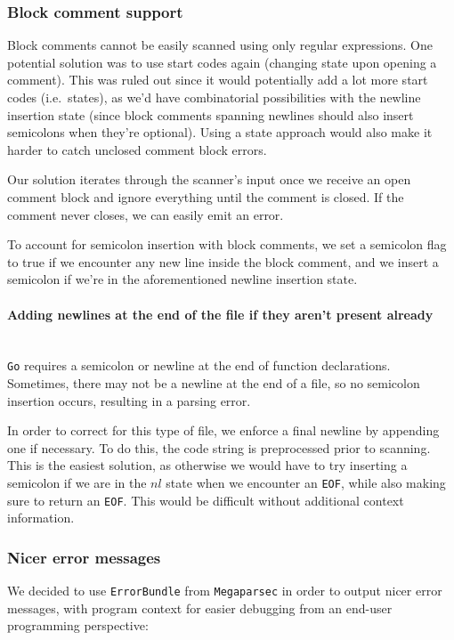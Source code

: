 \documentclass[11pt]{article}
\begin{document}
\subsubsection{Block comment support}
Block comments cannot be easily scanned using only regular
expressions. One potential solution was to use start codes again
(changing state upon opening a comment). This was ruled out since it
would potentially add a lot more start codes (i.e.\ states), as we'd
have combinatorial possibilities with the newline insertion state
(since block comments spanning newlines should also insert semicolons
when they're optional). Using a state approach would also make it
harder to catch unclosed comment block errors.

Our solution iterates through the scanner's input once we receive an
open comment block and ignore everything until the comment is closed.
If the comment never closes, we can easily emit an error.

To account for semicolon insertion with block comments, we set a
semicolon flag to true if we encounter any new line inside the block
comment, and we insert a semicolon if we're in the aforementioned
newline insertion state.
\paragraph{Adding newlines at the end of the file if they aren't
  present already}~\\
\texttt{Go} requires a semicolon or newline at the end of function
declarations. Sometimes, there may not be a newline at the end of a
file, so no semicolon insertion occurs, resulting in a parsing error.

In order to correct for this type of file, we enforce a final newline
by appending one if necessary. To do this, the code string is
preprocessed prior to scanning. This is the easiest solution, as
otherwise we would have to try inserting a semicolon if we are in the
\(nl\) state when we encounter an \texttt{EOF}, while also making sure
to return an \texttt{EOF}. This would be difficult without additional
context information.
\subsubsection{Nicer error messages}
We decided to use \texttt{ErrorBundle} from \texttt{Megaparsec}\cite{github:megaparsec} in
order to output nicer error messages, with program context for easier
debugging from an end-user programming perspective:
\end{document}
